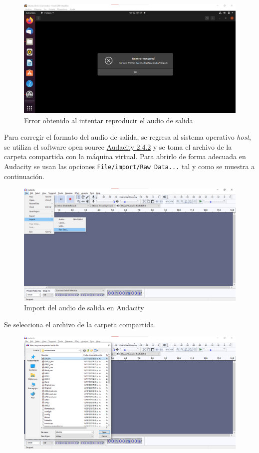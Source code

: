 \documentclass[conference,onecolumn]{IEEEtran}
\begin{document}
 \begin{figure}[H]
 \centering
    \includegraphics[scale=0.4]{VM6.png}
    \caption{Error obtenido al intentar reproducir el audio de salida} 
\end{figure}

Para corregir el formato del audio de salida, se regresa al sistema operativo \textit{host}, se utiliza el software open source \href{https://www.audacityteam.org/}{Audacity 2.4.2} y se toma el archivo de la carpeta compartida con la máquina virtual. Para abrirlo de forma adecuada en Audacity se usan las opciones \texttt{File/import/Raw Data...} tal y como se muestra a continuación.

 \begin{figure}[H]
 \centering
    \includegraphics[scale=0.45]{VM7.png}
    \caption{Import del audio de salida en Audacity}
\end{figure}

Se selecciona el archivo de la carpeta compartida.

 \begin{figure}[H]
 \centering
    \includegraphics[scale=0.45]{VM8.png}
\end{figure}
\end{document}
